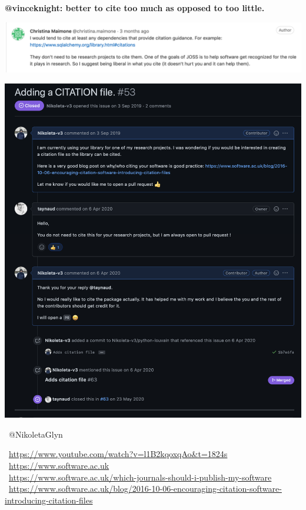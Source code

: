 \documentclass{beamer}
\begin{document}
\begin{frame}
    \centering
    \textbf{@vinceknight: better to cite too much as opposed to too little.}
    \vspace{1cm}
    \pause

    \includegraphics[width=\textwidth]{static/cite.png}
\end{frame}

\begin{frame}
    \begin{center}
    \includegraphics[width=.7\textwidth]{static/issue.png}
    \end{center}
\end{frame}

\begin{frame}
    \begin{center}
        \small
    \faTwitter \ @NikoletaGlyn \\
    \vspace{.75cm}

    \ \url{https://www.youtube.com/watch?v=l1B2kqoxqAo&t=1824s} \\
    \ \url{https://www.software.ac.uk} \\
    \ \url{https://www.software.ac.uk/which-journals-should-i-publish-my-software} \\
    \ \url{https://www.software.ac.uk/blog/2016-10-06-encouraging-citation-software-introducing-citation-files} \\
    \end{center}
\end{frame}
\end{document}
